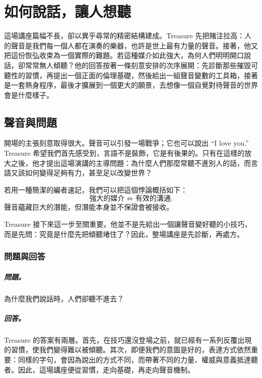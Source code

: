 \chapter{如何說話，讓人想聽}

這場講座篇幅不長，卻以異乎尋常的精密結構建成。Treasure 先把賭注拉高：人的聲音是我們每一個人都在演奏的樂器，也許是世上最有力量的聲音。接著，他又把這份恢弘收束為一個實際的難題。若這種媒介如此強大，為何人們明明開口說話，卻常常無人傾聽？他的回答按著一條刻意安排的次序展開：先診斷那些摧毀可聽性的習慣，再提出一個正面的倫理基礎，然後給出一組聲音變數的工具箱，接著是一套熱身程序，最後才擴展到一個更大的願景，去想像一個自覺對待聲音的世界會是什麼樣子。

\section{聲音與問題}

開場的主張刻意取得很大。聲音可以引發一場戰爭；它也可以說出 ``I love you.'' Treasure 希望我們首先感受到，言語不是裝飾，它是有後果的。只有在這樣的放大之後，他才提出這場演講的主導問題：為什麼人們那麼常聽不進別人的話，而言語又該如何變得足夠有力，甚至足以改變世界？

若用一種簡潔的編者速記，我們可以把這個悖論概括如下：
\begin{equation}
\text{強大的媒介} \not\Rightarrow \text{有效的溝通}.
\end{equation}
聲音蘊藏巨大的潛能，但潛能本身並不保證會被接收。

Treasure 接下來這一步至關重要。他並不是先給出一個讓聲音變好聽的小技巧，而是先問：究竟是什麼先把傾聽堵住了？因此，整場講座是先診斷，再處方。

\subsection{問題與回答}

\paragraph{問題。} 為什麼我們說話時，人們卻聽不進去？

\paragraph{回答。} Treasure 的答案有兩層。首先，在技巧還沒登場之前，就已經有一系列反覆出現的習慣，使我們變得難以被傾聽。其次，即便我們的意圖是好的，表達方式依然重要：同樣的字句，會因為說出的方式不同，而帶著不同的力量、權威與意義抵達聽者。因此，這場講座便從習慣，走向基礎，再走向聲音機制。

